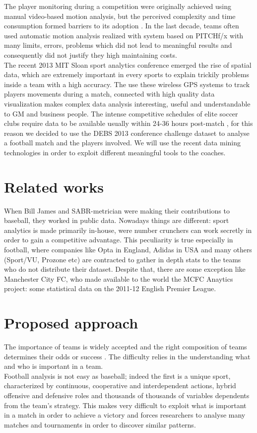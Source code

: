 \documentclass{acm_proc_article-sp-sigmod07}
\begin{document}
The player monitoring during a competition were originally achieved using manual video-based motion analysis, but the perceived complexity and time consumption formed barriers to its adoption \cite{james2006role}. In the last decade, teams often used automatic motion analysis realized with system based on PITCHf/x with many limits, errors, problems \cite{Choi20111274}\cite{Figueroa2006122} which did not lead to meaningful results and consequently did not justify they high maintaining costs.\\
The recent 2013 MIT Sloan sport analytics conference emerged \cite{mitsloan} the rise of spatial data, which are extremely important in every sports to explain trickily problems inside a team with a high accuracy. The use these wireless GPS systems to track players movements during a match, connected with high quality data visualization makes complex data analysis interesting, useful and understandable to GM and business people. The intense competitive schedules of elite soccer clubs require data to be available usually within 24-36 hours post-match \cite{Figueroa2006122}, for this reason we decided to use the DEBS 2013 conference \cite{debs2013} challenge \cite{debs20131} dataset to analyse a football match and the players involved. We will use the recent data mining technologies in order to exploit different meaningful tools to the coaches.

\section{Related works}
When Bill James and SABR-metrician were making their contributions to baseball, they worked in public data. Nowadays things are different: sport analytics is made primarily in-house, were number crunchers can work secretly in order to gain a competitive advantage. This peculiarity is true especially in football, where companies like Opta in England, Adidas in USA and many others (Sport/VU, Prozone etc) are contracted to gather in depth stats to the teams who do not distribute their dataset. Despite that, there are some exception like Manchester City FC, who made available to the world the MCFC Anaytics project: some statistical data on the 2011-12 English Premier League.

\section{Proposed approach}
The importance of teams is widely accepted \cite{Wisdom}\cite{vancollaboration} and the right composition of teams determines their odds or success \cite{guimera2005team}\cite{wuchty2007increasing}. The difficulty relies in the understanding what and who is important in a team.\\
Football analysis is not easy as baseball; indeed the first is a unique sport, characterized by continuous, cooperative and interdependent actions, hybrid offensive and defensive roles and thousands of thousands of variables dependents from the team’s strategy. This makes very difficult to exploit what is important in a match in order to achieve a victory and forces researchers to analyse many matches and tournaments in order to discover similar patterns.
 
\end{document}
